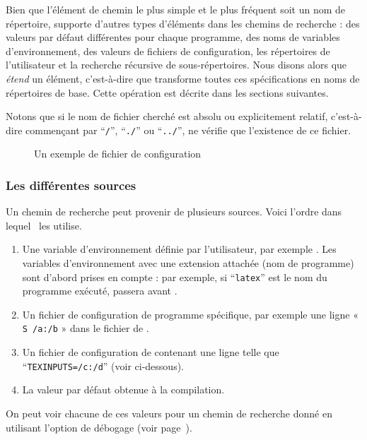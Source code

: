 \documentclass[german, english, french]{article}
\renewcommand{\samp}[1]{\enquote{\texttt{#1}}}
\begin{document}
Bien que l'élément de chemin le plus simple et le plus fréquent soit un nom de
répertoire, \KPS{} supporte d'autres types d'éléments dans les chemins de
recherche : des valeurs par défaut différentes pour chaque programme, des noms
de variables d'environnement, des valeurs de fichiers de configuration, les
répertoires de l'utilisateur et la recherche récursive de sous-répertoires. Nous
disons alors que \KPS{} \emph{étend} un élément, c'est-à-dire que \KPS{}
transforme toutes ces spécifications en noms de répertoires de base. Cette
opération est décrite dans les sections suivantes.

Notons que si le nom de fichier cherché est absolu ou explicitement relatif,
c'est-à-dire commençant par \samp{/}, \samp{./} ou \samp{../}, \KPS{} ne vérifie
que l'existence de ce fichier.  \ifSingleColumn \else
\begin{figure*}
  \centering  \setlength{\abovecaptionskip}{0pt}
  \caption{Un exemple de fichier de configuration}
  \label{fig:config-sample}
\end{figure*}
\fi

\subsubsection{Les différentes sources}
\label{sec:path-sources}

Un chemin de recherche peut provenir de plusieurs sources. Voici l'ordre dans
lequel \KPS\ les utilise.

\begin{enumerate}
\item Une variable d'environnement définie par l'utilisateur, par exemple
  . Les variables d'environnement avec une extension attachée
  (nom de programme) sont d'abord prises en compte : par exemple, si
  \samp{latex} est le nom du programme exécuté, 
  passera avant .
\item Un fichier de configuration de programme spécifique, par exemple une ligne
  « \texttt{S /a:/b} » dans le fichier  de .
\item Un fichier de configuration  de \KPS{} contenant une ligne
  telle que \\ \samp{TEXINPUTS=/c:/d} (voir ci-dessous).
\item La valeur par défaut obtenue à la compilation.
\end{enumerate}
\noindent On peut voir chacune de ces valeurs pour un chemin de recherche donné
en utilisant l'option de débogage (voir page~\pageref{sec:debugging}).
\end{document}
